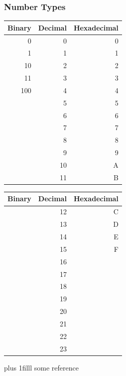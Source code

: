 \documentclass[fleqn]{beamer} %
\newcommand{\sectionIsubsectionIItitle}{Number Types}
\newcommand{\btVFill}{\vskip0pt plus 1filll}
\begin{document}
			\begin{frame}
				\frametitle{\sectionIsubsectionIItitle}\small
				\bigskip

				\begin{multicols}{2}
				\begin{tabular}{|r|r|r|} \hline
					Binary 	& Decimal 	& Hexadecimal \\ \hline
					0		& 0			& 0 		\\ \hline	
					1		& 1			& 1 		\\ \hline
					10		& 2			& 2 		\\ \hline
					11		& 3			& 3 		\\ \hline
					100		& 4			& 4 		\\ \hline
							& 5			& 5 		\\ \hline
							& 6			& 6 		\\ \hline
						    & 7			& 7 		\\ \hline
							& 8			& 8 		\\ \hline
							& 9			& 9 		\\ \hline
							& 10		& A 		\\ \hline
							& 11		& B 		\\ \hline
				\end{tabular}

				\begin{tabular}{|r|r|r|} \hline
					Binary 	& Decimal 	& Hexadecimal \\ \hline
							& 12		& C 		\\ \hline	
							& 13		& D 		\\ \hline
							& 14		& E 		\\ \hline
							& 15		& F 		\\ \hline
							& 16		&  		\\ \hline
							& 17		&  		\\ \hline
							& 18		&  		\\ \hline
							& 19		&  		\\ \hline
							& 20		&  		\\ \hline
							& 21		&  		\\ \hline
							& 22	    &  		\\ \hline
							& 23	    &  		\\ \hline
				\end{tabular}
				\end{multicols}

				\btVFill
				\tiny{some reference}		

			\end{frame}
\end{document}
